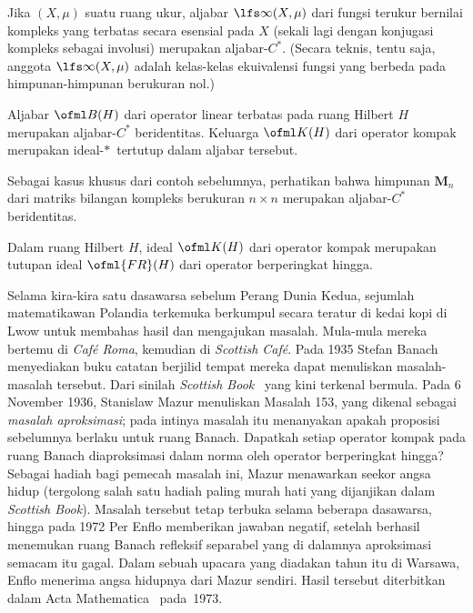 \begin{exam} Jika $(X,\mu)$ suatu ruang ukur, aljabar $\lfs\infty(X,\mu)$ dari
fungsi terukur bernilai kompleks yang terbatas secara esensial pada $X$ (sekali lagi dengan konjugasi
kompleks sebagai involusi) merupakan aljabar-$C^*$.  (Secara teknis, tentu saja, anggota
$\lfs\infty(X,\mu)$ adalah kelas-kelas ekuivalensi fungsi yang berbeda pada himpunan-himpunan berukuran nol.)
\end{exam}

\begin{exam}\label{001305fa} Aljabar $\ofml B(H)$ dari operator linear terbatas pada ruang Hilbert
$H$ merupakan aljabar-$C^*$ beridentitas.  Keluarga $\ofml K(H)$ dari operator kompak merupakan ideal-$*\,$ tertutup
dalam aljabar tersebut.
\end{exam}

\begin{exam}\label{001306} Sebagai kasus khusus dari contoh sebelumnya, perhatikan bahwa himpunan
$\mathbf M_n$ dari matriks bilangan kompleks berukuran $n \times n$ merupakan aljabar-$C^*$ beridentitas.
\end{exam}

\begin{prop}\label{prop_K_is_clo_FR} Dalam ruang Hilbert $H$, ideal $\ofml K(H)$ dari operator kompak merupakan tutupan
ideal $\ofml{FR}(H)$ dari operator berperingkat hingga.
\end{prop}

Selama kira-kira satu dasawarsa sebelum Perang Dunia Kedua, sejumlah matematikawan Polandia terkemuka berkumpul secara teratur di kedai
kopi di Lwow untuk membahas hasil dan mengajukan masalah.  Mula-mula mereka bertemu di \emph{Caf\'e Roma}, kemudian di
\emph{Scottish Caf\'e}.  Pada 1935 Stefan Banach menyediakan buku catatan berjilid tempat mereka dapat menuliskan masalah-masalah tersebut.
Dari sinilah \emph{Scottish Book}~\cite{Mauldin:1981} yang kini terkenal bermula.  Pada 6 November 1936, Stanislaw Mazur
menuliskan Masalah 153, yang dikenal sebagai \emph{masalah aproksimasi}; pada intinya masalah itu menanyakan apakah proposisi sebelumnya
berlaku untuk ruang Banach.  Dapatkah setiap operator kompak pada ruang Banach diaproksimasi dalam norma oleh operator berperingkat hingga?
Sebagai hadiah bagi pemecah masalah ini, Mazur menawarkan seekor angsa hidup (tergolong salah satu hadiah paling murah hati yang dijanjikan dalam
\emph{Scottish Book}).  Masalah tersebut tetap terbuka selama beberapa dasawarsa, hingga pada 1972 Per Enflo memberikan jawaban negatif,
setelah berhasil menemukan ruang Banach refleksif separabel yang di dalamnya aproksimasi semacam itu gagal.  Dalam sebuah upacara yang diadakan
tahun itu di Warsawa, Enflo menerima angsa hidupnya dari Mazur sendiri.  Hasil tersebut diterbitkan dalam Acta
Mathematica~\cite{Enflo:1973} pada~1973.

